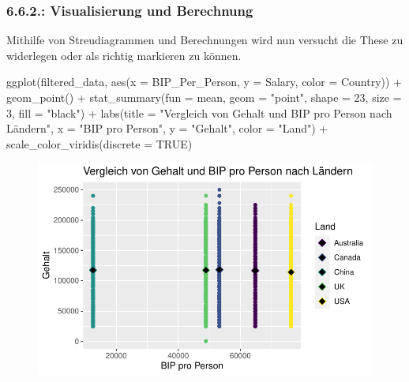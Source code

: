 \documentclass[
  letterpaper,
  DIV=11,
  numbers=noendperiod]{scrartcl}
\newenvironment{Shaded}{\begin{snugshade}}{\end{snugshade}}
\newcommand{\AttributeTok}[1]{\textcolor[rgb]{0.40,0.45,0.13}{#1}}
\newcommand{\ConstantTok}[1]{\textcolor[rgb]{0.56,0.35,0.01}{#1}}
\newcommand{\DecValTok}[1]{\textcolor[rgb]{0.68,0.00,0.00}{#1}}
\newcommand{\FunctionTok}[1]{\textcolor[rgb]{0.28,0.35,0.67}{#1}}
\newcommand{\NormalTok}[1]{\textcolor[rgb]{0.00,0.23,0.31}{#1}}
\newcommand{\SpecialCharTok}[1]{\textcolor[rgb]{0.37,0.37,0.37}{#1}}
\newcommand{\StringTok}[1]{\textcolor[rgb]{0.13,0.47,0.30}{#1}}
\begin{document}
\hypertarget{visualisierung-und-berechnung}{%
\subsubsection{6.6.2.: Visualisierung und
Berechnung}\label{visualisierung-und-berechnung}}

Mithilfe von Streudiagrammen und Berechnungen wird nun versucht die
These zu widerlegen oder als richtig markieren zu können.

\begin{Shaded}
\begin{Highlighting}[]
\FunctionTok{ggplot}\NormalTok{(filtered\_data, }\FunctionTok{aes}\NormalTok{(}\AttributeTok{x =}\NormalTok{ BIP\_Per\_Person, }\AttributeTok{y =}\NormalTok{ Salary, }\AttributeTok{color =}\NormalTok{ Country)) }\SpecialCharTok{+}
  \FunctionTok{geom\_point}\NormalTok{() }\SpecialCharTok{+}
  \FunctionTok{stat\_summary}\NormalTok{(}\AttributeTok{fun =}\NormalTok{ mean, }\AttributeTok{geom =} \StringTok{"point"}\NormalTok{, }\AttributeTok{shape =} \DecValTok{23}\NormalTok{, }\AttributeTok{size =} \DecValTok{3}\NormalTok{, }\AttributeTok{fill =} \StringTok{"black"}\NormalTok{) }\SpecialCharTok{+}
  \FunctionTok{labs}\NormalTok{(}\AttributeTok{title =} \StringTok{"Vergleich von Gehalt und BIP pro Person nach Ländern"}\NormalTok{,}
       \AttributeTok{x =} \StringTok{"BIP pro Person"}\NormalTok{,}
       \AttributeTok{y =} \StringTok{"Gehalt"}\NormalTok{,}
       \AttributeTok{color =} \StringTok{"Land"}\NormalTok{) }\SpecialCharTok{+}
  \FunctionTok{scale\_color\_viridis}\NormalTok{(}\AttributeTok{discrete =} \ConstantTok{TRUE}\NormalTok{)}
\end{Highlighting}
\end{Shaded}

\begin{figure}[H]

{\centering \includegraphics{main_doc_files/figure-pdf/unnamed-chunk-95-1.pdf}

}

\end{figure}
\end{document}
